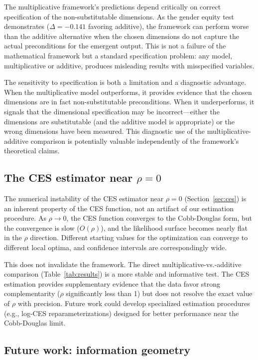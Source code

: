 \documentclass[12pt, a4paper]{article}
\theoremstyle{definition}
\theoremstyle{remark}
\begin{document}
The multiplicative framework's predictions depend critically on correct specification of the non-substitutable dimensions. As the gender equity test demonstrates ($\Delta = -0.141$ favoring additive), the framework can perform worse than the additive alternative when the chosen dimensions do not capture the actual preconditions for the emergent output. This is not a failure of the mathematical framework but a standard specification problem: any model, multiplicative or additive, produces misleading results with misspecified variables.

The sensitivity to specification is both a limitation and a diagnostic advantage. When the multiplicative model outperforms, it provides evidence that the chosen dimensions are in fact non-substitutable preconditions. When it underperforms, it signals that the dimensional specification may be incorrect---either the dimensions are substitutable (and the additive model is appropriate) or the wrong dimensions have been measured. This diagnostic use of the multiplicative-additive comparison is potentially valuable independently of the framework's theoretical claims.

\subsection{The CES estimator near $\rho = 0$}

The numerical instability of the CES estimator near $\rho = 0$ (Section~\ref{sec:ces}) is an inherent property of the CES function, not an artifact of our estimation procedure. As $\rho \to 0$, the CES function converges to the Cobb-Douglas form, but the convergence is slow ($O(\rho)$), and the likelihood surface becomes nearly flat in the $\rho$ direction. Different starting values for the optimization can converge to different local optima, and confidence intervals are correspondingly wide.

This does not invalidate the framework. The direct multiplicative-vs.-additive comparison (Table~\ref{tab:results}) is a more stable and informative test. The CES estimation provides supplementary evidence that the data favor strong complementarity ($\rho$ significantly less than 1) but does not resolve the exact value of $\rho$ with precision. Future work could develop specialized estimation procedures (e.g., log-CES reparameterizations) designed for better performance near the Cobb-Douglas limit.

\subsection{Future work: information geometry}
\end{document}
